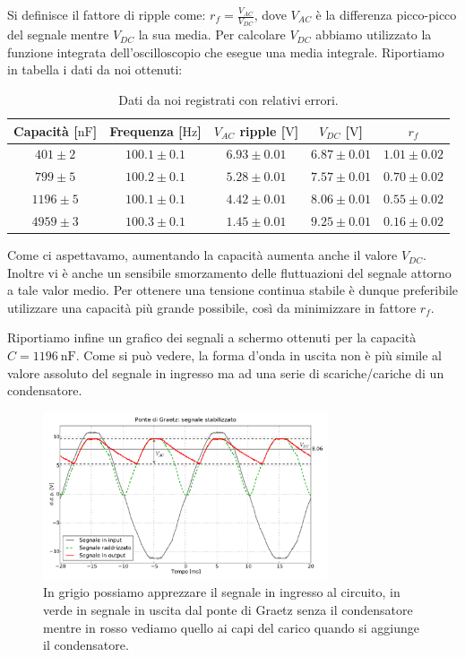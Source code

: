 Si definisce il fattore di ripple come: $r_f= \frac{V_{AC}}{V_{DC}}$, dove $V_{AC}$ è la differenza picco-picco del segnale mentre $V_{DC}$ la sua media. Per calcolare $V_{DC}$ abbiamo utilizzato la funzione integrata dell'oscilloscopio che esegue una media integrale. Riportiamo in tabella i dati da noi ottenuti:

\begin{table}[H]
\center
\caption{Dati da noi registrati con relativi errori.}
{\renewcommand{\arraystretch}{1.6}%
\begin{tabular}{c|c|c|c|c}
Capacità [$\si{\nano\farad}$] & Frequenza [$\si{\hertz}$] & $V_{AC}$ ripple [$\si{\volt}$] & $V_{DC}$ [$\si{\volt}$] & $r_f$ \\      \hline
$401 \pm 2$ &$100.1 \pm 0.1 $& $6.93 \pm 0.01$ & $6.87 \pm 0.01$ & $1.01 \pm 0.02$\\
$799 \pm 5$ &$100.2 \pm 0.1$& $5.28 \pm 0.01$ & $7.57 \pm 0.01$ & $0.70 \pm 0.02$\\
$1196 \pm 5$ &$100.1 \pm 0.1$& $4.42 \pm 0.01$ & $8.06 \pm 0.01$ & $0.55 \pm 0.02$\\
$4959 \pm 3$ &$100.3 \pm 0.1$& $1.45 \pm 0.01$ & $9.25 \pm 0.01$& $0.16 \pm 0.02$\\
\end{tabular}}
\end{table}

Come ci aspettavamo, aumentando la capacità aumenta anche il valore $V_{DC}$. Inoltre vi è anche un sensibile smorzamento delle fluttuazioni del segnale attorno a tale valor medio. Per ottenere una tensione continua stabile è dunque preferibile utilizzare una capacità più grande possibile, così da minimizzare in fattore $r_f$.

Riportiamo infine un grafico dei segnali a schermo ottenuti per la capacità $C=\SI{1196}{\nano\farad}$. Come si può vedere, la forma d'onda in uscita non è più simile al valore assoluto del segnale in ingresso ma ad una serie di scariche/cariche di un condensatore.

\begin{figure}[h]
\center
	\includegraphics[width=0.75\textwidth]{ripple.pdf}
	\caption{In grigio possiamo apprezzare il segnale in ingresso al circuito, in verde in segnale in uscita dal ponte di Graetz senza il condensatore mentre in rosso vediamo quello ai capi del carico quando si aggiunge il condensatore.}
	\label{fig:ripple}
\end{figure}